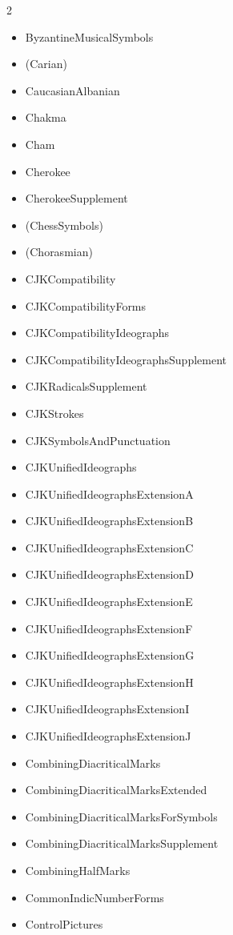 \documentclass{article}
\newenvironment{itemlist}{%
  \begin{itemize}
  \setlength{\itemsep}{0pt}
  \setlength{\parsep}{0pt}
  \setlength{\topsep}{0pt}
  \setlength{\partopsep}{0pt}
  \setlength{\parskip}{0pt}
  \setlength{\labelsep}{5pt}}%
{
  \end{itemize}}
\begin{document}
\begin{multicols*}{2}
\begin{itemlist}
        \item ByzantineMusicalSymbols
        \item (Carian)
        \item CaucasianAlbanian
        \item Chakma
        \item Cham
        \item Cherokee
        \item CherokeeSupplement
        \item (ChessSymbols)
        \item (Chorasmian)
        \item CJKCompatibility
        \item CJKCompatibilityForms
        \item CJKCompatibilityIdeographs
        \item CJKCompatibilityIdeographsSupplement
        \item CJKRadicalsSupplement
        \item CJKStrokes
        \item CJKSymbolsAndPunctuation
        \item CJKUnifiedIdeographs
        \item CJKUnifiedIdeographsExtensionA
        \item CJKUnifiedIdeographsExtensionB
        \item CJKUnifiedIdeographsExtensionC
        \item CJKUnifiedIdeographsExtensionD
        \item CJKUnifiedIdeographsExtensionE
        \item CJKUnifiedIdeographsExtensionF
        \item CJKUnifiedIdeographsExtensionG
        \item CJKUnifiedIdeographsExtensionH
        \item CJKUnifiedIdeographsExtensionI
        \item CJKUnifiedIdeographsExtensionJ
        \item CombiningDiacriticalMarks
        \item CombiningDiacriticalMarksExtended
        \item CombiningDiacriticalMarksForSymbols
        \item CombiningDiacriticalMarksSupplement
        \item CombiningHalfMarks
        \item CommonIndicNumberForms
        \item ControlPictures

\end{itemlist}
\end{multicols*}
\end{document}
